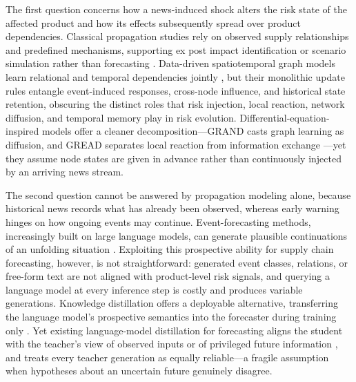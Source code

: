 The first question concerns how a news-induced shock alters the risk state of the affected product and how its effects subsequently spread over product dependencies. Classical propagation studies rely on observed supply relationships and predefined mechanisms, supporting ex post impact identification or scenario simulation rather than forecasting \cite{carvalho2021supply,inoue2019firm,li2021ripple}. Data-driven spatiotemporal graph models learn relational and temporal dependencies jointly \cite{DBLP:conf/iclr/LiYS018,DBLP:conf/ijcai/YuYZ18}, but their monolithic update rules entangle event-induced responses, cross-node influence, and historical state retention, obscuring the distinct roles that risk injection, local reaction, network diffusion, and temporal memory play in risk evolution. Differential-equation-inspired models offer a cleaner decomposition---GRAND casts graph learning as diffusion, and GREAD separates local reaction from information exchange \cite{DBLP:conf/icml/0001RGBWR21,DBLP:conf/icml/00020PC23}---yet they assume node states are given in advance rather than continuously injected by an arriving news stream.

The second question cannot be answered by propagation modeling alone, because historical news records what has already been observed, whereas early warning hinges on how ongoing events may continue. Event-forecasting methods, increasingly built on large language models, can generate plausible continuations of an unfolding situation \cite{DBLP:conf/aaai/HuLNLS17,DBLP:conf/nips/ShiXWZZZTM23,DBLP:journals/corr/abs-2407-01231}. Exploiting this prospective ability for supply chain forecasting, however, is not straightforward: generated event classes, relations, or free-form text are not aligned with product-level risk signals, and querying a language model at every inference step is costly and produces variable generations. Knowledge distillation offers a deployable alternative, transferring the language model's prospective semantics into the forecaster during training only \cite{hinton2015distilling,DBLP:conf/iclr/TianKI20}. Yet existing language-model distillation for forecasting aligns the student with the teacher's view of observed inputs or of privileged future information \cite{liu2025calf,liu2025timekd}, and treats every teacher generation as equally reliable---a fragile assumption when hypotheses about an uncertain future genuinely disagree.


